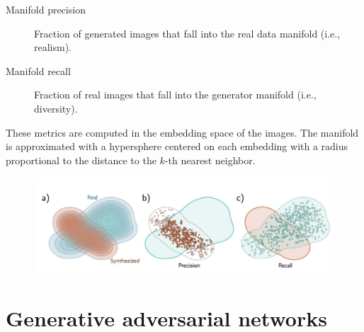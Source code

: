\begin{description}
    \item[Manifold precision] 
        Fraction of generated images that fall into the real data manifold (i.e., realism).

    \item[Manifold recall] 
        Fraction of real images that fall into the generator manifold (i.e., diversity).
\end{description}

\begin{remark}
    These metrics are computed in the embedding space of the images. The manifold is approximated with a hypersphere centered on each embedding with a radius proportional to the distance to the $k$-th nearest neighbor.
\end{remark}

\begin{figure}[H]
    \centering
    \includegraphics[width=0.8\linewidth]{./img/manifold_precision_recall.jpg}
\end{figure}



\section{Generative adversarial networks}


